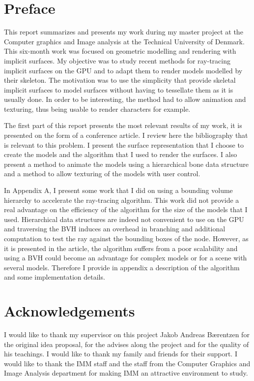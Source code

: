 \documentclass[11pt,a4paper,english]{article}
\begin{document}
	


	\section{Preface}

This report summarizes and presents my work during my master project at the Computer graphics and Image analysis at the Technical University of Denmark. This six-month work was focused on geometric modelling and rendering with implicit surfaces. My objective was to study recent methods for ray-tracing implicit surfaces on the GPU and to adapt them to render models modelled by their skeleton.
The motivation was to use the simplicity that provide skeletal implicit surfaces to model surfaces without having to tessellate them as it is usually done. In order to be interesting, the method had to allow animation and texturing, thus being usable to render characters for example.

The first part of this report presents the most relevant results of my work, it is presented on the form of a conference article. I review here the bibliography that is relevant to this problem. I present the surface representation that I choose to create the models and the algorithm that I used to render the surfaces. I also present a method to animate the models using a hierarchical bone data structure and a method to allow texturing of the models with user control.

In Appendix A, I present some work that I did on using a bounding volume hierarchy to accelerate the ray-tracing algorithm. This work did not provide a real advantage on the efficiency of the algorithm for the size of the models that I used. Hierarchical data structures are indeed not convenient to use on the GPU and traversing the BVH induces an overhead in branching and additional computation to test the ray against the bounding boxes of the node. However, as it is presented in the article, the algorithm suffers from a poor scalability and using a BVH could become an advantage for complex models or for a scene with several models. Therefore I provide in appendix a description of the algorithm and some implementation details.

\newpage
\section{Acknowledgements}


I would like to thank my supervisor on this project Jakob Andreas B{\ae}rentzen for the original idea proposal, for the advises along the project and for the quality of his teachings. I would like to thank my family and friends for their support. I would like to thank the IMM staff and the staff from the Computer Graphics and Image Analysis department for making IMM an attractive environment to study.
\end{document}
